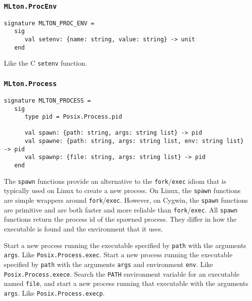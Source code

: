 \subsubsection{\tt MLton.ProcEnv}
\begin{verbatim}
signature MLTON_PROC_ENV =
   sig
      val setenv: {name: string, value: string} -> unit
   end
\end{verbatim}

\begin{description}
Like the C {\tt setenv} function.
\end{description}

\subsubsection{\tt MLton.Process}

\begin{verbatim}
signature MLTON_PROCESS =
   sig
      type pid = Posix.Process.pid

      val spawn: {path: string, args: string list} -> pid
      val spawne: {path: string, args: string list, env: string list} -> pid
      val spawnp: {file: string, args: string list} -> pid
   end
\end{verbatim}

The {\tt spawn} functions provide an alternative to the {\tt fork}/{\tt exec}
idiom that is typically used on Linux to create a new process.  On Linux, the
{\tt spawn} functions are simple wrappers around {\tt fork}/{\tt exec}.
However, on Cygwin, the {\tt spawn} functions are primitive and are both faster
and more reliable than {\tt fork}/{\tt exec}.  All {\tt spawn} functions return
the process id of the spawned process.  They differ in how the executable is
found and the environment that it uses.

\begin{description}
Start a new process running the executable specified by {\tt path} with the
arguments {\tt args}.  Like {\tt Posix.Process.exec}.
Start a new process running the executable specified by {\tt path} with the
arguments {\tt args} and environment {\tt env}.  Like {\tt Posix.Process.exece}.
Search the {\tt PATH} environment variable for an executable named {\tt file},
and start a new process running that executable with the arguments {\tt args}.
Like {\tt Posix.Process.execp}.
\end{description}


